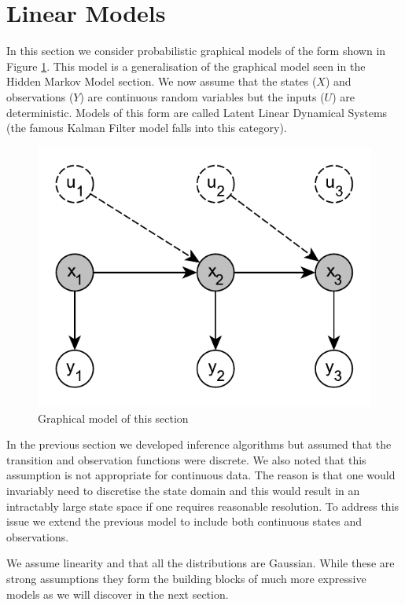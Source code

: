 \documentclass[../masters.tex]{subfiles}
\begin{document}
\graphicspath{{./imgs/}{../imgs/}} %

\section{Linear Models}
In this section we consider probabilistic graphical models of the form shown in Figure \ref{fig_linmod}. This model is a generalisation of the graphical model seen in the Hidden Markov Model section. We now assume that the states ($X$) and observations ($Y$) are continuous random variables but the inputs ($U$) are deterministic. Models of this form are called Latent Linear Dynamical Systems (the famous Kalman Filter model falls into this category).
\begin{figure}[H] 
\centering
\includegraphics[scale=1.0]{linear_model.pdf}
\caption{Graphical model of this section}
\label{fig_linmod}
\end{figure}
In the previous section we developed inference algorithms but assumed that the transition and observation functions were discrete. We also noted that this assumption is not appropriate for continuous data. The reason is that one would invariably need to discretise the state domain and this would result in an intractably large state space if one requires reasonable resolution. To address this issue we extend the previous model to include both continuous states and observations. 

We assume linearity and that all the distributions are Gaussian. While these are strong assumptions they form the building blocks of much more expressive models as we will discover in the next section. 
%
%
%
\end{document}
